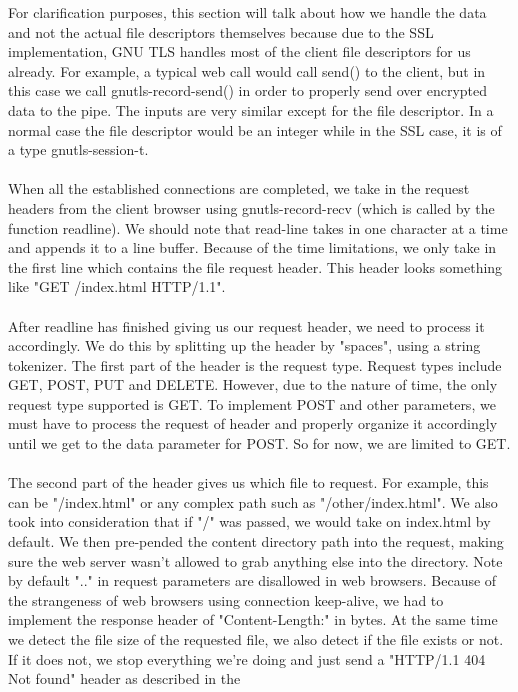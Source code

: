 \documentclass[a4paper,12pt]{article}
\begin{document}
For clarification purposes, this section will talk about how we handle
the data and not the actual file descriptors themselves because due to
the SSL implementation, GNU TLS handles most of the client file descriptors
for us already. For example, a typical web call would call send() to the client,
but in this case we call gnutls-record-send() in order to properly send
over encrypted data to the pipe. The inputs are very similar except for the
file descriptor. In a normal case the file descriptor would be an integer
while in the SSL case, it is of a type gnutls-session-t.\\
\\
When all the established connections are completed, we take in the request
headers from the client browser using gnutls-record-recv (which is called
by the function readline). We should note that read-line takes in one
character at a time and appends it to a line buffer. Because of the time
limitations, we only take in the first line which contains the file request
header. This header looks something like "GET /index.html HTTP/1.1".\\
\\
After readline has finished giving us our request header, we need to
process it accordingly. We do this by splitting up the header by "spaces",
using a string tokenizer. The first part of the header is the request type.
Request types include GET, POST, PUT and DELETE. However, due to the 
nature of time, the only request type supported is GET. To implement
POST and other parameters, we must have to process the request of
header and properly organize it accordingly until we get to the
data parameter for POST. So for now, we are limited to GET.\\ 
\\
The second part of the header gives us which file to request. For example, this
can be "/index.html" or any complex path such as "/other/index.html".
We also took into consideration that if "/" was passed, we would take
on index.html by default. We then pre-pended the content directory
path into the request, making sure the web server wasn't allowed to 
grab anything else into the directory. Note by default ".." in request
parameters are disallowed in web browsers. Because of the strangeness
of web browsers using connection keep-alive, we had to implement
the response header of "Content-Length:" in bytes. At the same time
we detect the file size of the requested file, we also detect if
the file exists or not. If it does not, we stop everything we're doing
and just send a "HTTP/1.1 404 Not found" header as described in the
\end{document}
